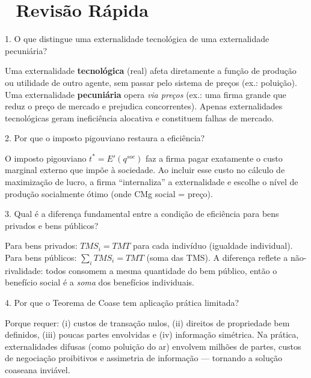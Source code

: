\documentclass[11pt,twoside,openright]{book}
\begin{document}
\section{🧠 Revisão Rápida}\label{revisuxe3o-ruxe1pida-2}

\begin{infobox}{1. O que distingue uma externalidade tecnológica de uma externalidade pecuniária?}

Uma externalidade \textbf{tecnológica} (real) afeta diretamente a função
de produção ou utilidade de outro agente, sem passar pelo sistema de
preços (ex.: poluição). Uma externalidade \textbf{pecuniária} opera
\emph{via preços} (ex.: uma firma grande que reduz o preço de mercado e
prejudica concorrentes). Apenas externalidades tecnológicas geram
ineficiência alocativa e constituem falhas de mercado.

\end{infobox}

\begin{infobox}{2. Por que o imposto pigouviano restaura a eficiência?}

O imposto pigouviano \(t^* = E'(q^{soc})\) faz a firma pagar exatamente
o custo marginal externo que impõe à sociedade. Ao incluir esse custo no
cálculo de maximização de lucro, a firma ``internaliza'' a externalidade
e escolhe o nível de produção socialmente ótimo (onde CMg social =
preço).

\end{infobox}

\begin{infobox}{3. Qual é a diferença fundamental entre a condição de eficiência para bens privados e bens públicos?}

Para bens privados: \(TMS_i = TMT\) para cada indivíduo (igualdade
individual). Para bens públicos: \(\sum_i TMS_i = TMT\) (soma das TMS).
A diferença reflete a não-rivalidade: todos consomem a mesma quantidade
do bem público, então o benefício social é a \emph{soma} dos benefícios
individuais.

\end{infobox}

\begin{infobox}{4. Por que o Teorema de Coase tem aplicação prática limitada?}

Porque requer: (i) custos de transação nulos, (ii) direitos de
propriedade bem definidos, (iii) poucas partes envolvidas e (iv)
informação simétrica. Na prática, externalidades difusas (como poluição
do ar) envolvem milhões de partes, custos de negociação proibitivos e
assimetria de informação --- tornando a solução coaseana inviável.

\end{infobox}
\end{document}

